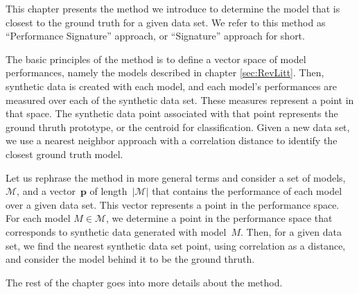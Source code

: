 \label{sec:Approach}

This chapter presents the method we introduce to determine the model that is closest to the ground truth for a given data set.  We refer to this method as ``Performance Signature'' approach, or ``Signature'' approach for short. 

The basic principles of the method is to define a vector space of model performances, namely the models described in chapter \ref{sec:RevLitt}.  Then, synthetic data is created with each model, and each model's performances are measured over each of the synthetic data set.  These measures represent a point in that space. The synthetic data point associated with that point represents the ground thruth prototype, or the centroid for classification.  Given a new data set, we use a nearest neighbor approach with a correlation distance to identify the closest ground truth model.

Let us rephrase the method in more general terms and consider a set of models, $\mathcal{M}$, and a vector~$\mathbf{p}$ of length~$|\mathcal{M}|$ that contains the performance of each model over a given data set.  This vector represents a point in the performance space.  For each model $M \in \mathcal{M}$, we determine a point in the performance space that corresponds to synthetic data generated with model~$M$.  Then, for a given data set, we find the nearest synthetic data set point, using correlation as a distance, and consider the model behind it to be the ground thruth.


The rest of the chapter goes into more details about the method.



